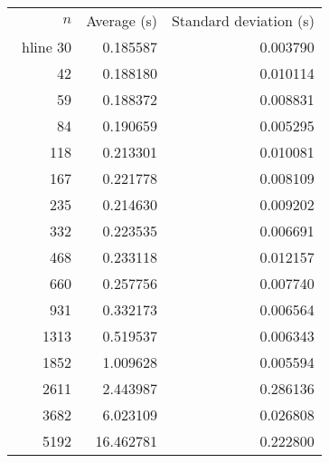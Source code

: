 \begin{tabular}{rrr}
$n$& Average (s) & Standard deviation (s)\\\ hline
30& 0.185587& 0.003790\\
42& 0.188180& 0.010114\\
59& 0.188372& 0.008831\\
84& 0.190659& 0.005295\\
118& 0.213301& 0.010081\\
167& 0.221778& 0.008109\\
235& 0.214630& 0.009202\\
332& 0.223535& 0.006691\\
468& 0.233118& 0.012157\\
660& 0.257756& 0.007740\\
931& 0.332173& 0.006564\\
1313& 0.519537& 0.006343\\
1852& 1.009628& 0.005594\\
2611& 2.443987& 0.286136\\
3682& 6.023109& 0.026808\\
5192& 16.462781& 0.222800\\
\end{tabular}
